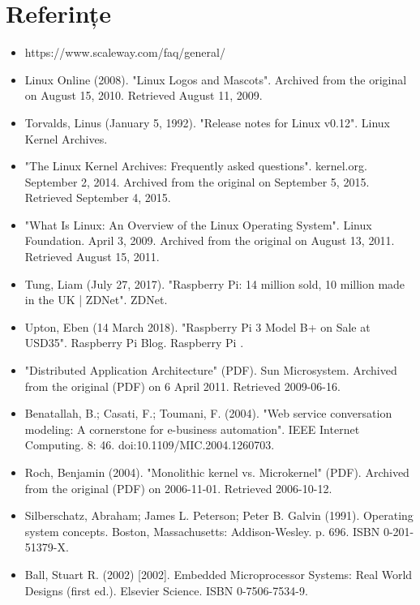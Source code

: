 \documentclass[a4paper, 12pt, twoside]{report}
\begin{document}
{\newpage\null\thispagestyle{empty}\newpage

\listoffigures

\newpage\null\thispagestyle{empty}\newpage

\lstlistoflistings

\newpage\null\thispagestyle{empty}\newpage

\chapter{Referințe}
\begin{itemize}
\item https://www.scaleway.com/faq/general/
\item Linux Online (2008). "Linux Logos and Mascots". Archived from the original on August 15, 2010. Retrieved August 11, 2009.
\item Torvalds, Linus (January 5, 1992). "Release notes for Linux v0.12". Linux Kernel Archives.
\item "The Linux Kernel Archives: Frequently asked questions". kernel.org. September 2, 2014. Archived from the original on September 5, 2015. Retrieved September 4, 2015.
\item "What Is Linux: An Overview of the Linux Operating System". Linux Foundation. April 3, 2009. Archived from the original on August 13, 2011. Retrieved August 15, 2011.
\item Tung, Liam (July 27, 2017). "Raspberry Pi: 14 million sold, 10 million made in the UK | ZDNet". ZDNet.
\item Upton, Eben (14 March 2018). "Raspberry Pi 3 Model B+ on Sale at USD35". Raspberry Pi Blog. Raspberry Pi .
\item  "Distributed Application Architecture" (PDF). Sun Microsystem. Archived from the original (PDF) on 6 April 2011. Retrieved 2009-06-16.
\item Benatallah, B.; Casati, F.; Toumani, F. (2004). "Web service conversation modeling: A cornerstone for e-business automation". IEEE Internet Computing. 8: 46. doi:10.1109/MIC.2004.1260703.
\item Roch, Benjamin (2004). "Monolithic kernel vs. Microkernel" (PDF). Archived from the original (PDF) on 2006-11-01. Retrieved 2006-10-12.
\item Silberschatz, Abraham; James L. Peterson; Peter B. Galvin (1991). Operating system concepts. Boston, Massachusetts: Addison-Wesley. p. 696. ISBN 0-201-51379-X.
\item Ball, Stuart R. (2002) [2002]. Embedded Microprocessor Systems: Real World Designs (first ed.). Elsevier Science. ISBN 0-7506-7534-9.

\end{itemize}}
\end{document}
